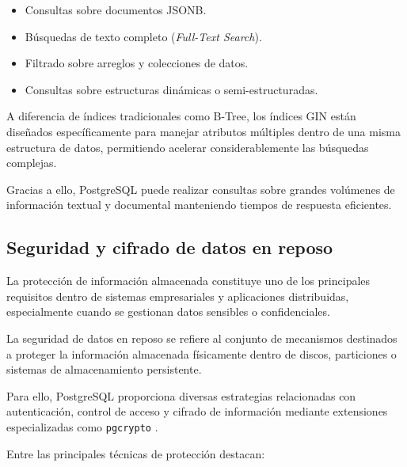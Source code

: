 \documentclass[12pt, oneside, letterpaper]{book}
\begin{document}
\begin{itemize}

\item Consultas sobre documentos JSONB.

\item Búsquedas de texto completo (\textit{Full-Text Search}).

\item Filtrado sobre arreglos y colecciones de datos.

\item Consultas sobre estructuras dinámicas o semi-estructuradas.
\end{itemize}

A diferencia de índices tradicionales como B-Tree, los índices GIN están diseñados específicamente para manejar atributos múltiples dentro de una misma estructura de datos, permitiendo acelerar considerablemente las búsquedas complejas.

Gracias a ello, PostgreSQL puede realizar consultas sobre grandes volúmenes de información textual y documental manteniendo tiempos de respuesta eficientes.

\subsection{Seguridad y cifrado de datos en reposo}

La protección de información almacenada constituye uno de los principales requisitos dentro de sistemas empresariales y aplicaciones distribuidas, especialmente cuando se gestionan datos sensibles o confidenciales.

La seguridad de datos en reposo se refiere al conjunto de mecanismos destinados a proteger la información almacenada físicamente dentro de discos, particiones o sistemas de almacenamiento persistente.

Para ello, PostgreSQL proporciona diversas estrategias relacionadas con autenticación, control de acceso y cifrado de información mediante extensiones especializadas como \texttt{pgcrypto} \cite{60}.

Entre las principales técnicas de protección destacan:
\end{document}
